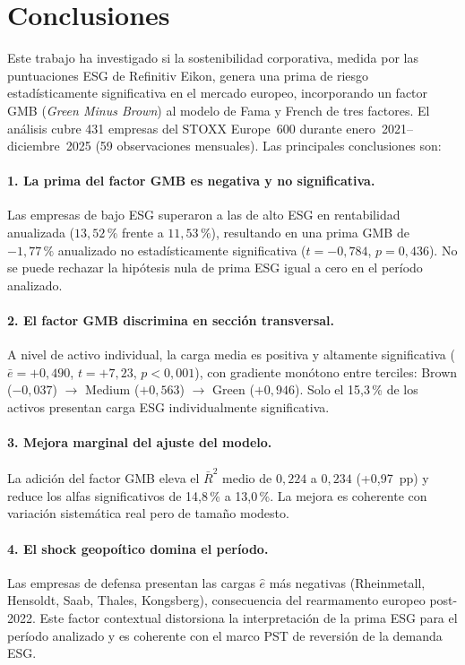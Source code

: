 \documentclass[12pt, a4paper]{article}
\begin{document}
\section{Conclusiones}
\label{sec:conclusiones}

Este trabajo ha investigado si la sostenibilidad corporativa, medida por las puntuaciones
ESG de Refinitiv Eikon, genera una prima de riesgo estad\'isticamente significativa en el
mercado europeo, incorporando un factor GMB (\textit{Green Minus Brown}) al modelo de
Fama y French de tres factores. El an\'alisis cubre 431 empresas del STOXX Europe~600
durante enero~2021--diciembre~2025 (59 observaciones mensuales). Las principales
conclusiones son:

\paragraph{1. La prima del factor GMB es negativa y no significativa.}
Las empresas de bajo ESG superaron a las de alto ESG en rentabilidad anualizada
($13{,}52\,\%$ frente a $11{,}53\,\%$), resultando en una prima GMB de $-1{,}77\,\%$
anualizado no estad\'isticamente significativa ($t=-0{,}784$, $p=0{,}436$). No se
puede rechazar la hip\'otesis nula de prima ESG igual a cero en el per\'iodo analizado.

\paragraph{2. El factor GMB discrimina en secci\'on transversal.}
A nivel de activo individual, la carga media es positiva y altamente significativa
($\bar{e}=+0{,}490$, $t=+7{,}23$, $p<0{,}001$), con gradiente mon\'otono entre
terciles: Brown ($-0{,}037$) $\to$ Medium ($+0{,}563$) $\to$ Green ($+0{,}946$).
Solo el 15{,}3\,\% de los activos presentan carga ESG individualmente significativa.

\paragraph{3. Mejora marginal del ajuste del modelo.}
La adici\'on del factor GMB eleva el $\bar{R}^2$ medio de $0{,}224$ a $0{,}234$
(+0{,}97~pp) y reduce los alfas significativos de 14{,}8\,\% a 13{,}0\,\%. La mejora
es coherente con variaci\'on sistem\'atica real pero de tama\~no modesto.

\paragraph{4. El shock geopo\'itico domina el per\'iodo.}
Las empresas de defensa presentan las cargas $\hat{e}$ m\'as negativas (Rheinmetall,
Hensoldt, Saab, Thales, Kongsberg), consecuencia del rearmamento europeo post-2022.
Este factor contextual distorsiona la interpretaci\'on de la prima ESG para el per\'iodo
analizado y es coherente con el marco PST de reversi\'on de la demanda ESG.
\end{document}
